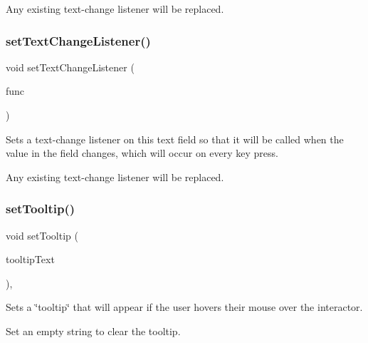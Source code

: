 Any existing text-\/change listener will be replaced. \mbox{\label{classGTextField_ae8df75b0746951146d29220f386fcd33}} 
\subsubsection{\texorpdfstring{set\+Text\+Change\+Listener()}{setTextChangeListener()}\hspace{0.1cm}{\footnotesize\ttfamily [2/2]}}
{\footnotesize\ttfamily void set\+Text\+Change\+Listener (\begin{DoxyParamCaption}\item[{G\+Event\+Listener\+Void}]{func }\end{DoxyParamCaption})\hspace{0.3cm}{\ttfamily [virtual]}}



Sets a text-\/change listener on this text field so that it will be called when the value in the field changes, which will occur on every key press. 

Any existing text-\/change listener will be replaced. \mbox{\label{classGInteractor_a039e0e49beaecc275efce02d416acea8}} 
\subsubsection{\texorpdfstring{set\+Tooltip()}{setTooltip()}}
{\footnotesize\ttfamily void set\+Tooltip (\begin{DoxyParamCaption}\item[{const std\+::string \&}]{tooltip\+Text }\end{DoxyParamCaption})\hspace{0.3cm}{\ttfamily [virtual]}, {\ttfamily [inherited]}}



Sets a \char`\"{}tooltip\char`\"{} that will appear if the user hovers their mouse over the interactor. 

Set an empty string to clear the tooltip. \mbox{\label{classGTextField_ae803b3348fa7076308d852bbdeea0d74}} 
